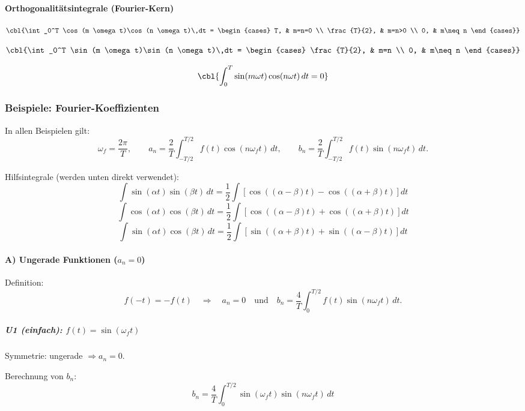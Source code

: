 \paragraph{Orthogonalitätsintegrale (Fourier-Kern)}

\[
\cbl{\int_0^T \cos(m \omega t)\cos(n \omega t)\,dt =
\begin{cases}
T, & m=n=0 \\
\frac{T}{2}, & m=n>0 \\
0, & m\neq n
\end{cases}}
\]

\[
\cbl{\int_0^T \sin(m \omega t)\sin(n \omega t)\,dt =
\begin{cases}
\frac{T}{2}, & m=n \\
0, & m\neq n
\end{cases}}
\]

\[
\cbl{\int_0^T \sin(m \omega t)\cos(n \omega t)\,dt = 0}
\]
\subsubsection{Beispiele: Fourier-Koeffizienten}

In allen Beispielen gilt:
\[
\omega_f=\frac{2\pi}{T}, 
\qquad
a_n=\frac{2}{T}\int_{-T/2}^{T/2} f(t)\cos(n\omega_f t)\,dt,
\qquad
b_n=\frac{2}{T}\int_{-T/2}^{T/2} f(t)\sin(n\omega_f t)\,dt.
\]

Hilfsintegrale (werden unten direkt verwendet):
\[
\int \sin(\alpha t)\sin(\beta t)\,dt
=\frac{1}{2}\int\left[\cos((\alpha-\beta)t)-\cos((\alpha+\beta)t)\right]dt
\]
\[
\int \cos(\alpha t)\cos(\beta t)\,dt
=\frac{1}{2}\int\left[\cos((\alpha-\beta)t)+\cos((\alpha+\beta)t)\right]dt
\]
\[
\int \sin(\alpha t)\cos(\beta t)\,dt
=\frac{1}{2}\int\left[\sin((\alpha+\beta)t)+\sin((\alpha-\beta)t)\right]dt
\]

\paragraph{A) Ungerade Funktionen ($a_n = 0$)}

Definition:
\[
f(-t)=-f(t)
\quad\Rightarrow\quad
\boxed{a_n=0}
\quad\text{und}\quad
b_n=\frac{4}{T}\int_0^{T/2} f(t)\sin(n\omega_f t)\,dt.
\]

\subparagraph{U1 (einfach): $f(t)=\sin(\omega_f t)$}

Symmetrie: ungerade $\Rightarrow a_n=0$.

Berechnung von $b_n$:
\[
b_n=\frac{4}{T}\int_0^{T/2}\sin(\omega_f t)\sin(n\omega_f t)\,dt
\]

